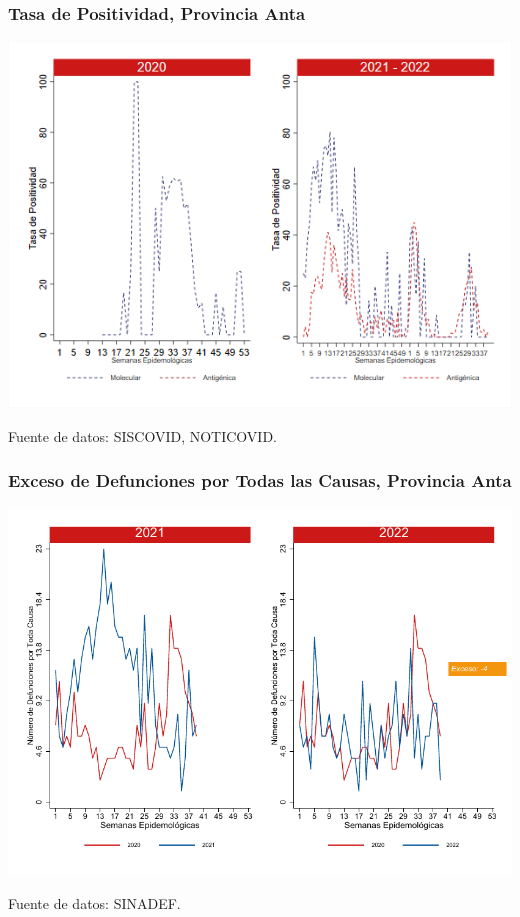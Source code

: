 \documentclass[xcolor=table]{beamer}
\begin{document}
\begin{frame}
	\frametitle{Tasa de Positividad, Provincia Anta}
	\vspace{-.5cm}
	\begin{center}
		\includegraphics[width=0.8\linewidth, trim={0cm .5cm 0cm 0.2cm},clip]{../figuras/positividad_20_21_2.png}
	\end{center}
	{\tiny Fuente de datos: SISCOVID, NOTICOVID.}
\end{frame}

\begin{frame}
	\frametitle{Exceso de Defunciones por Todas las Causas, Provincia Anta}
	\vspace{-.5cm}
	\begin{center}
		\includegraphics[width=0.8\linewidth, trim={0cm .5cm 0cm 0.2cm},clip]{../figuras/exceso_2.pdf}
	\end{center}
	{\tiny Fuente de datos: SINADEF.}
	
	\hyperlink{indicadores_provinciales}{}
\end{frame}
\end{document}
